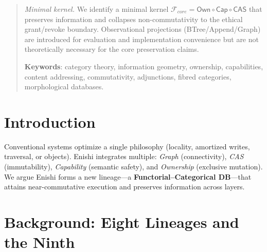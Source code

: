 \documentclass[10pt]{article}
\begin{document}
\begin{abstract}
\emph{Minimal kernel.} We identify a minimal kernel $\mathcal{F}_{core} = \mathsf{Own} \circ \mathsf{Cap} \circ \mathsf{CAS}$ that preserves information and collapses non-commutativity to the ethical grant/revoke boundary. Observational projections (BTree/Append/Graph) are introduced for evaluation and implementation convenience but are not theoretically necessary for the core preservation claims.

\textbf{Keywords}: category theory, information geometry, ownership, capabilities, content addressing, commutativity, adjunctions, fibred categories, morphological databases.
\end{abstract}

\section{Introduction}
Conventional systems optimize a single philosophy (locality, amortized writes, traversal, or objects).
Enishi integrates multiple: \emph{Graph} (connectivity), \emph{CAS} (immutability), \emph{Capability} (semantic safety),
and \emph{Ownership} (exclusive mutation).
We argue Enishi forms a new lineage---a \textbf{Functorial--Categorical DB}---that attains near-commutative execution
and preserves information across layers.

\section{Background: Eight Lineages and the Ninth}
\end{document}
